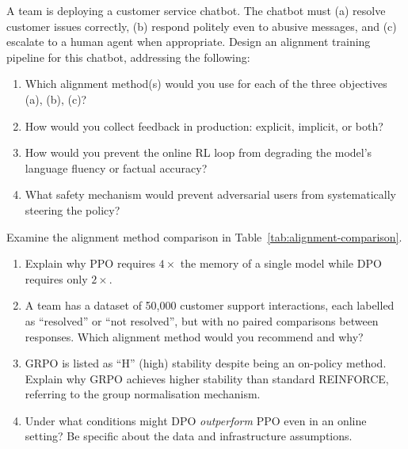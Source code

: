 \begin{exercise}
\label{ex:online-rl-design}
A team is deploying a customer service chatbot. The chatbot must (a) resolve customer issues correctly, (b) respond politely even to abusive messages, and (c) escalate to a human agent when appropriate. Design an alignment training pipeline for this chatbot, addressing the following:
\begin{enumerate}
  \item Which alignment method(s) would you use for each of the three objectives (a), (b), (c)?
  \item How would you collect feedback in production: explicit, implicit, or both?
  \item How would you prevent the online RL loop from degrading the model's language fluency or factual accuracy?
  \item What safety mechanism would prevent adversarial users from systematically steering the policy?
\end{enumerate}
\end{exercise}

\begin{exercise}
\label{ex:comparison-table}
Examine the alignment method comparison in Table~\ref{tab:alignment-comparison}.
\begin{enumerate}
  \item Explain why PPO requires $4\times$ the memory of a single model while DPO requires only $2\times$.
  \item A team has a dataset of 50{,}000 customer support interactions, each labelled as ``resolved'' or ``not resolved'', but with no paired comparisons between responses. Which alignment method would you recommend and why?
  \item GRPO is listed as ``H'' (high) stability despite being an on-policy method. Explain why GRPO achieves higher stability than standard REINFORCE, referring to the group normalisation mechanism.
  \item Under what conditions might DPO \emph{outperform} PPO even in an online setting? Be specific about the data and infrastructure assumptions.
\end{enumerate}
\end{exercise}

